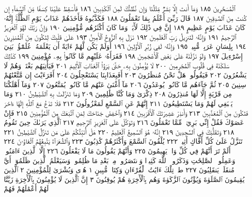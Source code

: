 ٱلْمُسَحَّرِينَ ١٨٥ وَمَآ أَنتَ إِلَّا بَشَرࣱ مِّثْلُنَا وَإِن نَّظُنُّكَ لَمِنَ
ٱلْكَٰذِبِينَ ١٨٦ فَأَسْقِطْ عَلَيْنَا كِسَفࣰا مِّنَ ٱلسَّمَآءِ إِن كُنتَ
مِنَ ٱلصَّٰدِقِينَ ١٨٧ قَالَ رَبِّيٓ أَعْلَمُ بِمَا تَعْمَلُونَ ١٨٨ فَكَذَّبُوهُ
فَأَخَذَهُمْ عَذَابُ يَوْمِ ٱلظُّلَّةِۚ إِنَّهُۥ كَانَ عَذَابَ يَوْمٍ عَظِيمٍ ١٨٩
إِنَّ فِي ذَٰلِكَ لَأٓيَةࣰۖ وَمَا كَانَ أَكْثَرُهُم مُّؤْمِنِينَ ١٩٠ وَإِنَّ رَبَّكَ
لَهُوَ ٱلْعَزِيزُ ٱلرَّحِيمُ ١٩١ وَإِنَّهُۥ لَتَنزِيلُ رَبِّ ٱلْعَٰلَمِينَ ١٩٢ نَزَلَ بِهِ
ٱلرُّوحُ ٱلْأَمِينُ ١٩٣ عَلَىٰ قَلْبِكَ لِتَكُونَ مِنَ ٱلْمُنذِرِينَ ١٩٤ بِلِسَانٍ
عَرَبِيࣲّ مُّبِينࣲ ١٩٥ وَإِنَّهُۥ لَفِي زُبُرِ ٱلْأَوَّلِينَ ١٩٦ أَوَلَمْ يَكُن لَّهُمْ ءَايَةً
أَن يَعْلَمَهُۥ عُلَمَٰٓؤُا۟ بَنِيٓ إِسْرَٰٓءِيلَ ١٩٧ وَلَوْ نَزَّلْنَٰهُ عَلَىٰ بَعْضِ
ٱلْأَعْجَمِينَ ١٩٨ فَقَرَأَهُۥ عَلَيْهِم مَّا كَانُوا۟ بِهِۦ مُؤْمِنِينَ ١٩٩ كَذَٰلِكَ سَلَكْنَٰهُ
فِي قُلُوبِ ٱلْمُجْرِمِينَ ٢٠٠ لَا يُؤْمِنُونَ بِهِۦ حَتَّىٰ يَرَوُا۟ ٱلْعَذَابَ
ٱلْأَلِيمَ ٢٠١ فَيَأْتِيَهُم بَغْتَةࣰ وَهُمْ لَا يَشْعُرُونَ ٢٠٢ فَيَقُولُوا۟
هَلْ نَحْنُ مُنظَرُونَ ٢٠٣ أَفَبِعَذَابِنَا يَسْتَعْجِلُونَ ٢٠٤ أَفَرَءَيْتَ
إِن مَّتَّعْنَٰهُمْ سِنِينَ ٢٠٥ ثُمَّ جَآءَهُم مَّا كَانُوا۟ يُوعَدُونَ ٢٠٦
مَآ أَغْنَىٰ عَنْهُم مَّا كَانُوا۟ يُمَتَّعُونَ ٢٠٧ وَمَآ أَهْلَكْنَا
مِن قَرْيَةٍ إِلَّا لَهَا مُنذِرُونَ ٢٠٨ ذِكْرَىٰ وَمَا كُنَّا
ظَٰلِمِينَ ٢٠٩ وَمَا تَنَزَّلَتْ بِهِ ٱلشَّيَٰطِينُ ٢١٠ وَمَا يَنۢبَغِي لَهُمْ
وَمَا يَسْتَطِيعُونَ ٢١١ إِنَّهُمْ عَنِ ٱلسَّمْعِ لَمَعْزُولُونَ ٢١٢
فَلَا تَدْعُ مَعَ ٱللَّهِ إِلَٰهًا ءَاخَرَ فَتَكُونَ مِنَ ٱلْمُعَذَّبِينَ ٢١٣
وَأَنذِرْ عَشِيرَتَكَ ٱلْأَقْرَبِينَ ٢١٤ وَٱخْفِضْ جَنَاحَكَ لِمَنِ ٱتَّبَعَكَ
مِنَ ٱلْمُؤْمِنِينَ ٢١٥ فَإِنْ عَصَوْكَ فَقُلْ إِنِّي بَرِيٓءࣱ مِّمَّا تَعْمَلُونَ ٢١٦
وَتَوَكَّلْ عَلَى ٱلْعَزِيزِ ٱلرَّحِيمِ ٢١٧ ٱلَّذِي يَرَىٰكَ حِينَ تَقُومُ ٢١٨
وَتَقَلُّبَكَ فِي ٱلسَّٰجِدِينَ ٢١٩ إِنَّهُۥ هُوَ ٱلسَّمِيعُ ٱلْعَلِيمُ ٢٢٠
هَلْ أُنَبِّئُكُمْ عَلَىٰ مَن تَنَزَّلُ ٱلشَّيَٰطِينُ ٢٢١ تَنَزَّلُ عَلَىٰ كُلِّ
أَفَّاكٍ أَثِيمࣲ ٢٢٢ يُلْقُونَ ٱلسَّمْعَ وَأَكْثَرُهُمْ كَٰذِبُونَ ٢٢٣
وَٱلشُّعَرَآءُ يَتَّبِعُهُمُ ٱلْغَاوُۥنَ ٢٢٤ أَلَمْ تَرَ أَنَّهُمْ فِي كُلِّ وَادࣲ
يَهِيمُونَ ٢٢٥ وَأَنَّهُمْ يَقُولُونَ مَا لَا يَفْعَلُونَ ٢٢٦ إِلَّا ٱلَّذِينَ
ءَامَنُوا۟ وَعَمِلُوا۟ ٱلصَّٰلِحَٰتِ وَذَكَرُوا۟ ٱللَّهَ كَثِيرࣰا وَٱنتَصَرُوا۟ مِنۢ
بَعْدِ مَا ظُلِمُوا۟ۗ وَسَيَعْلَمُ ٱلَّذِينَ ظَلَمُوٓا۟ أَيَّ مُنقَلَبࣲ يَنقَلِبُونَ ٢٢٧
طسٓۚ تِلْكَ ءَايَٰتُ ٱلْقُرْءَانِ وَكِتَابࣲ مُّبِينٍ ١ هُدࣰى وَبُشْرَىٰ
لِلْمُؤْمِنِينَ ٢ ٱلَّذِينَ يُقِيمُونَ ٱلصَّلَوٰةَ وَيُؤْتُونَ ٱلزَّكَوٰةَ وَهُم بِٱلْأٓخِرَةِ
هُمْ يُوقِنُونَ ٣ إِنَّ ٱلَّذِينَ لَا يُؤْمِنُونَ بِٱلْأٓخِرَةِ زَيَّنَّا لَهُمْ أَعْمَٰلَهُمْ فَهُمْ

